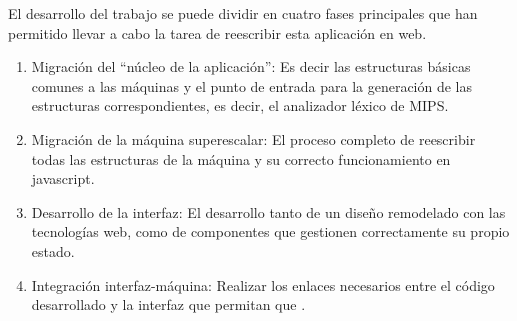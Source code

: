 

El desarrollo del trabajo se puede dividir en cuatro fases principales que han permitido llevar a cabo la tarea de reescribir esta aplicación en web.


\begin{enumerate}
   \item Migración del “núcleo de la aplicación”: Es decir las estructuras básicas comunes a las máquinas y el punto de entrada para la generación de las estructuras correspondientes, es decir, el analizador léxico de MIPS.

   \item Migración de la máquina superescalar: El proceso completo de reescribir todas las estructuras de la máquina y su correcto funcionamiento en javascript.

   \item Desarrollo de la interfaz: El desarrollo tanto de un diseño remodelado con las tecnologías web, como de componentes que gestionen correctamente su propio estado.
   
   \item Integración interfaz-máquina: Realizar los enlaces necesarios entre el código desarrollado y la interfaz que permitan que .
\end{enumerate}

